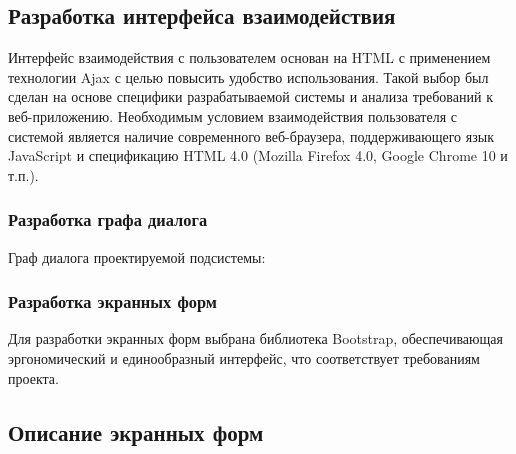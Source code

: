 \subsection{Разработка интерфейса взаимодействия}

Интерфейс взаимодействия с пользователем основан на HTML с применением
технологии Ajax с целью повысить удобство использования. Такой выбор был сделан на
основе специфики разрабатываемой системы и анализа требований к веб-приложению.
Необходимым условием взаимодействия пользователя с системой является наличие
современного веб-браузера, поддерживающего язык JavaScript и спецификацию HTML 4.0
(Mozilla Firefox 4.0, Google Chrome 10 и т.п.).

\subsubsection{Разработка графа диалога}

Граф диалога проектируемой подсистемы:



\subsubsection{Разработка экранных форм}

Для разработки экранных форм выбрана библиотека Bootstrap, обеспечивающая эргономический и единообразный интерфейс, что соответствует требованиям проекта.

\subsection{Описание экранных форм}